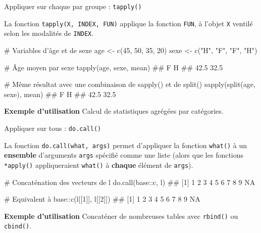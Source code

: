 \documentclass[12pt,handout,ignorenonframetext,]{beamer}
\newenvironment{Shaded}{}{}
\newcommand{\KeywordTok}[1]{\textcolor[rgb]{0.00,0.00,1.00}{#1}}
\newcommand{\DecValTok}[1]{#1}
\newcommand{\StringTok}[1]{\textcolor[rgb]{0.00,0.50,0.50}{#1}}
\newcommand{\CommentTok}[1]{\textcolor[rgb]{0.00,0.50,0.00}{#1}}
\newcommand{\OperatorTok}[1]{#1}
\newcommand{\NormalTok}[1]{#1}
\renewenvironment{Shaded}{\begin{snugshade}}{\end{snugshade}}
\begin{document}
\begin{frame}[fragile]{\large Appliquer sur chaque par groupe :
\texttt{tapply()}}

La fonction \texttt{tapply(X,\ INDEX,\ FUN)} applique la fonction
\texttt{FUN}, à l'objet \texttt{X} ventilé selon les modalités de
\texttt{INDEX}.

\footnotesize \pause

\begin{Shaded}
\begin{Highlighting}[]
\CommentTok{# Variables d'âge et de sexe}
\NormalTok{age <-}\StringTok{ }\KeywordTok{c}\NormalTok{(}\DecValTok{45}\NormalTok{, }\DecValTok{50}\NormalTok{, }\DecValTok{35}\NormalTok{, }\DecValTok{20}\NormalTok{)}
\NormalTok{sexe <-}\StringTok{ }\KeywordTok{c}\NormalTok{(}\StringTok{"H"}\NormalTok{, }\StringTok{"F"}\NormalTok{, }\StringTok{"F"}\NormalTok{, }\StringTok{"H"}\NormalTok{)}

\CommentTok{# Âge moyen par sexe}
\KeywordTok{tapply}\NormalTok{(age, sexe, mean)}
\NormalTok{  ##    F    H }
\NormalTok{  ## 42.5 32.5}

\CommentTok{# Même résultat avec une combinaison de sapply() et de split()}
\KeywordTok{sapply}\NormalTok{(}\KeywordTok{split}\NormalTok{(age, sexe), mean)}
\NormalTok{  ##    F    H }
\NormalTok{  ## 42.5 32.5}
\end{Highlighting}
\end{Shaded}

\normalsize \pause \vspace{-0.2cm}

\textbf{Exemple d'utilisation} Calcul de statistiques agrégées par
catégories.

\end{frame}

\begin{frame}[fragile]{\large Appliquer sur tous : \texttt{do.call()}}

La fonction \texttt{do.call(what,\ args)} permet d'appliquer la fonction
\texttt{what()} à un \textbf{ensemble} d'arguments \texttt{args}
spécifié comme une liste (alors que les fonctions \texttt{*apply()}
appliqueraient \texttt{what()} à \textbf{chaque} élément de
\texttt{args}).

\pause \small

\begin{Shaded}
\begin{Highlighting}[]
\CommentTok{# Concaténation des vecteurs de l}
\KeywordTok{do.call}\NormalTok{(base}\OperatorTok{::}\NormalTok{c, l)}
\NormalTok{  ##  [1]  1  2  3  4  5  6  7  8  9 NA}

\CommentTok{# Equivalent à }
\NormalTok{base}\OperatorTok{::}\KeywordTok{c}\NormalTok{(l[[}\DecValTok{1}\NormalTok{]], l[[}\DecValTok{2}\NormalTok{]])}
\NormalTok{  ##  [1]  1  2  3  4  5  6  7  8  9 NA}
\end{Highlighting}
\end{Shaded}

\pause \normalsize

\textbf{Exemple d'utilisation} Concaténer de nombreuses tables avec
\texttt{rbind()} ou \texttt{cbind()}.

\end{frame}
\end{document}
